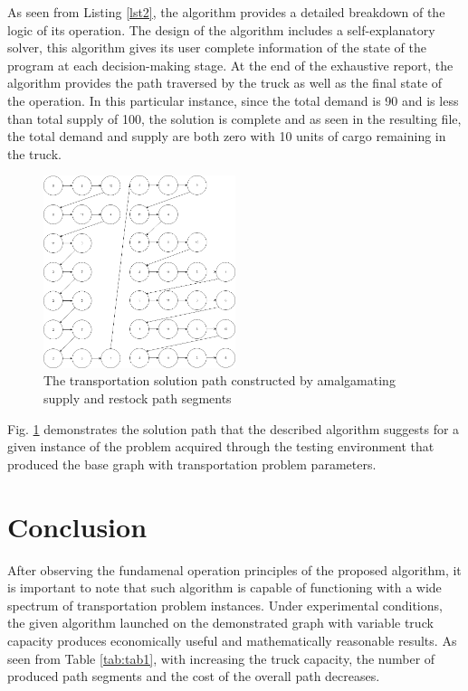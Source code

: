 \documentclass[journal,onecolumn]{IEEEtran}
\begin{document}
\lstset{basicstyle=\ttfamily}


As seen from Listing \ref{lst2}, the algorithm provides a detailed breakdown of the logic of its operation. The design of the algorithm includes a self-explanatory solver, this algorithm gives its user complete information of the state of the program at each decision-making stage. 
At the end of the exhaustive report, the algorithm provides the path traversed by the truck as well as the final state of the operation. In this particular instance, since the total demand is 90 and is  less than total supply of 100, the solution is complete and as seen in the resulting file, the total demand and supply are both zero with 10 units of cargo remaining in the truck.

\begin{figure}[h]
	\centering
  	\includegraphics[width=0.5\textwidth]{img/img4.png}
  	\caption{The transportation solution path constructed by amalgamating supply and restock path segments}	
  	\label{fig:img4}
\end{figure}

Fig. \ref{fig:img4} demonstrates the solution path that the described algorithm suggests for a given instance of the problem acquired through the testing environment that produced the base graph with transportation problem parameters.


\section{Conclusion}
After observing the fundamenal operation principles of the proposed algorithm, it is important to note that such algorithm is capable of functioning with a wide spectrum of transportation problem instances. Under experimental conditions, the given algorithm launched on the demonstrated graph  with variable truck capacity produces economically useful and mathematically reasonable results. As seen from Table \ref{tab:tab1}, with increasing the truck capacity, the number of produced path segments and the cost of the overall path decreases.
 
\end{document}
